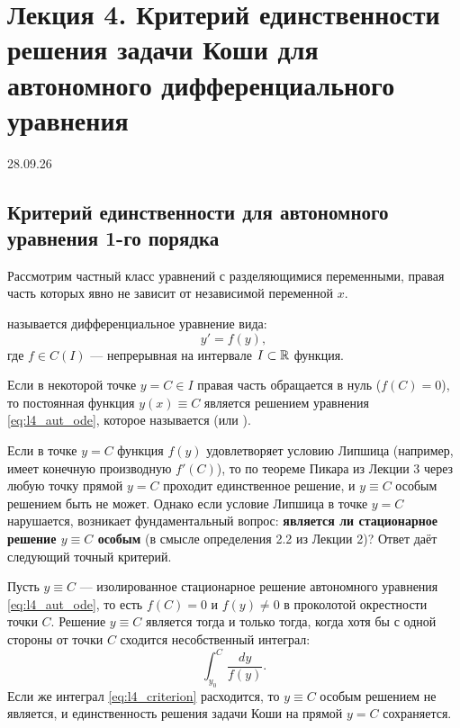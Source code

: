 \section{Лекция 4. Критерий единственности решения задачи Коши для автономного дифференциального уравнения}

\begin{flushright}
    28.09.26
\end{flushright}

\subsection{Критерий единственности для автономного уравнения 1-го порядка}

Рассмотрим частный класс уравнений с разделяющимися переменными, правая часть
которых явно не зависит от независимой переменной $x$.

\begin{definition}
     называется дифференциальное уравнение вида:
    \begin{equation} \label{eq:l4_aut_ode}
        y' = f(y), \tag{1}
    \end{equation}
    где $f \in C(I)$ — непрерывная на интервале $I \subset \mathbb{R}$ функция.
\end{definition}

Если в некоторой точке $y = C \in I$ правая часть обращается в нуль
($f(C) = 0$), то постоянная функция $y(x) \equiv C$ является решением уравнения
\eqref{eq:l4_aut_ode}, которое называется  (или
).

Если в точке $y = C$ функция $f(y)$ удовлетворяет условию Липшица (например,
имеет конечную производную $f'(C)$), то по теореме Пикара из Лекции 3 через
любую точку прямой $y = C$ проходит единственное решение, и $y \equiv C$
особым решением быть не может. Однако если условие Липшица в точке $y = C$
нарушается, возникает фундаментальный вопрос: \textbf{является ли стационарное
решение $y \equiv C$ особым} (в смысле определения 2.2 из Лекции 2)? Ответ даёт
следующий точный критерий.

\begin{theorem}
    Пусть $y \equiv C$ — изолированное стационарное решение автономного
    уравнения \eqref{eq:l4_aut_ode}, то есть $f(C) = 0$ и $f(y) \neq 0$ в
    проколотой окрестности точки $C$. Решение $y \equiv C$ является
     тогда и только тогда, когда хотя бы с одной стороны от
    точки $C$ сходится несобственный интеграл:
    \begin{equation} \label{eq:l4_criterion}
        \int_{y_0}^{C} \frac{dy}{f(y)}. \tag{2}
    \end{equation}
    Если же интеграл \eqref{eq:l4_criterion} расходится, то $y \equiv C$
    особым решением не является, и единственность решения задачи Коши на прямой
    $y = C$ сохраняется.
\end{theorem}

